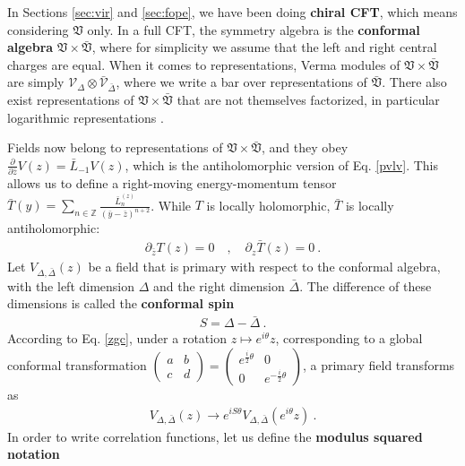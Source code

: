 \documentclass[12pt, a4paper]{article}
\theoremstyle{break}
\begin{document}
In Sections \ref{sec:vir} and \ref{sec:fope}, we have been doing \textbf{chiral CFT}, which means considering $\mathfrak{V}$ only. In a full CFT, the symmetry algebra is the \textbf{conformal algebra} $\mathfrak{V}\times \bar{\mathfrak{V}}$, where for simplicity we assume that the left and right central charges are equal. When it comes to representations, Verma modules of $\mathfrak{V}\times \bar{\mathfrak{V}}$ are simply $\mathcal{V}_\Delta\otimes \bar{\mathcal{V}}_{\bar \Delta}$, where we write a bar over representations of $\bar{\mathfrak{V}}$. There also exist representations of $\mathfrak{V}\times \bar{\mathfrak{V}}$ that are not themselves factorized, in particular logarithmic representations \cite{nr20}. 

Fields now belong to representations of $\mathfrak{V}\times \bar{\mathfrak{V}}$, and they obey $\frac{\partial}{\partial \bar z} V(z) = \bar L_{-1} V(z)$, which is the antiholomorphic version of Eq. \eqref{pvlv}. This allows us to define a right-moving energy-momentum tensor $\bar T(y) = \sum_{n\in\mathbb{Z}} \frac{\bar L_n^{(z)}}{(\bar y-\bar z)^{n+2}}$. While $T$ is locally holomorphic, $\bar T$ is locally antiholomorphic:
\begin{align}
 \partial_{\bar z} T(z) = 0 \quad , \quad \partial_z \bar T(z) = 0 \ . 
\end{align}
Let $V_{\Delta,\bar\Delta}(z)$ be a field that is primary with respect to the conformal algebra, with the left dimension $\Delta$ and the right dimension $\bar\Delta$. The difference of these dimensions is called the \textbf{conformal spin}
\begin{align}
 S = \Delta -\bar\Delta\ . 
 \label{sdd} 
\end{align}
According to Eq. \eqref{zgc}, 
under a rotation $z\mapsto e^{i\theta}z$, corresponding to a global conformal transformation $\left(\begin{smallmatrix} a & b \\ c & d\end{smallmatrix}\right)= \left(\begin{smallmatrix} e^{\frac{i}{2}\theta} & 0 \\ 0 &  e^{-\frac{i}{2}\theta}\end{smallmatrix}\right)$, a primary field transforms as 
\begin{align}
 V_{\Delta,\bar\Delta}(z) \to  e^{iS\theta} V_{\Delta,\bar\Delta}\left(e^{i\theta} z\right) \ .
 \label{veis}
\end{align}
In order to write correlation functions, let us define the \textbf{modulus squared notation} 
\end{document}
